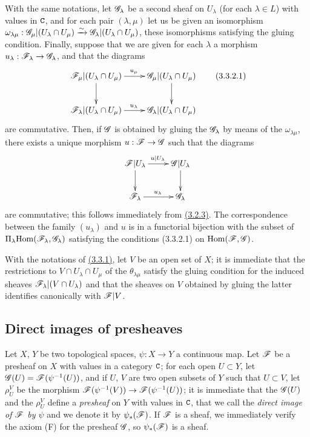 \begin{env}[3.3.2]
\label{0.3.3.2}
With the same notations, let $\mathscr{G}_\lambda$ be a second sheaf on $U_\lambda$
(for each $\lambda\in L$) with values in $\mathtt{C}$, and for each pair $(\lambda,\mu)$
let us be given an isomorphism
$\omega_{\lambda\mu}:\mathscr{G}_\mu|(U_\lambda\cap U_\mu)
  \xrightarrow{\sim}\mathscr{G}_\lambda|(U_\lambda\cap U_\mu)$, these isomorphisms satisfying the
gluing condition. Finally, suppose that we are given for each $\lambda$ a
morphism $u_\lambda:\mathscr{F}_\lambda\to\mathscr{G}_\lambda$, and that the diagrams
\[
  \xymatrix{
    \sh{F}_\mu|(U_\lambda\cap U_\mu)\ar[r]^{u_\mu}\ar[d] &
    \sh{G}_\mu|(U_\lambda\cap U_\mu)\ar[d]\\
    \sh{F}_\lambda|(U_\lambda\cap U_\mu)\ar[r]^{u_\lambda} &
    \sh{G}_\lambda|(U_\lambda\cap U_\mu)
  }
  \tag{3.3.2.1}
\]
are commutative. Then, if $\mathscr{G}$ is obtained by gluing the $\mathscr{G}_\lambda$ by
means of the $\omega_{\lambda\mu}$, there exists a unique morphism
$u:\mathscr{F}\to\mathscr{G}$ such that the diagrams
\[
  \xymatrix{
    \sh{F}|U_\lambda\ar[r]^{u|U_\lambda}\ar[d] &
    \sh{G}|U_\lambda\ar[d]\\
    \sh{F}_\lambda\ar[r]^{u_\lambda} &
    \sh{G}_\lambda
  }
\]
are commutative; this follows immediately from \hyperref[0.3.2.3]{(3.2.3)}. The
correspondence between the family $(u_\lambda)$ and $u$ is in a functorial
bijection with the subset of $\Pi_\lambda{\mathop{\mathrm{Hom}}\nolimits}(\mathscr{F}_\lambda,\mathscr{G}_\lambda)$
satisfying the conditions (3.3.2.1) on ${\mathop{\mathrm{Hom}}\nolimits}(\mathscr{F},\mathscr{G})$.
\end{env}

\begin{env}[3.3.3]
\label{0.3.3.3}
With the notations of \hyperref[0.3.3.1]{(3.3.1)}, let $V$ be an open set of $X$; it is
immediate that the restrictions to $V\cap U_\lambda\cap U_\mu$ of the
$\theta_{\lambda\mu}$ satisfy the gluing condition for the induced sheaves
$\mathscr{F}_\lambda|(V\cap U_\lambda)$ and that the sheaves on $V$ obtained by
gluing the latter identifies canonically with $\mathscr{F}|V$.
\end{env}

\subsection{Direct images of presheaves}
\label{subsection-direct-images-of-presheaves}

\begin{env}[3.4.1]
\label{0.3.4.1}
Let $X$, $Y$ be two topological spaces, $\psi:X\to Y$ a continuous map. Let
$\mathscr{F}$ be a presheaf on $X$ with values in a category $\mathtt{C}$; for each open
$U\subset Y$, let $\mathscr{G}(U)=\mathscr{F}(\psi^{-1}(U))$, and if $U$, $V$ are two open
subsets of $Y$ such that $U\subset V$, let $\rho_U^V$ be the morphism
$\mathscr{F}(\psi^{-1}(V))\to\mathscr{F}(\psi^{-1}(U))$; it is immediate that the
$\mathscr{G}(U)$ and the $\rho_U^V$ define a {\em presheaf} on $Y$ with values in
$\mathtt{C}$, that we call the {\em direct image of $\mathscr{F}$ by $\psi$} and we denote
it by $\psi_*(\mathscr{F})$. If $\mathscr{F}$ is a sheaf, we immediately verify the axiom
(F) for the presheaf $\mathscr{G}$, so $\psi_*(\mathscr{F})$ is a sheaf.
\end{env}


